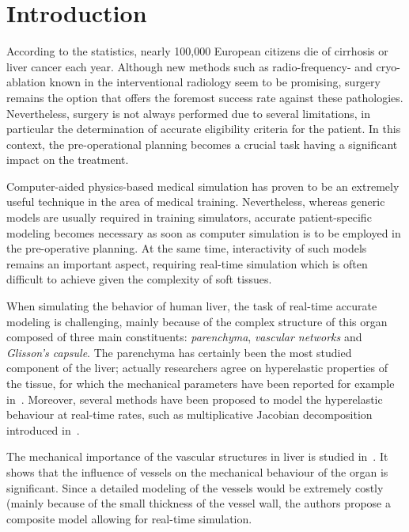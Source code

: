 \documentclass{acm_proc_article-sp}
\newcommand{\TG}[1]{{\color{blue}\textbf{TG: #1}}}
\begin{document}




\section{Introduction} %

According to the statistics, nearly 100,000 European citizens die of cirrhosis or liver cancer each year. 
Although new methods such as radio-frequency- and cryo-ablation known in the interventional radiology 
seem to be promising, surgery remains the option that offers the foremost success rate against these pathologies. 
Nevertheless, surgery is not always performed due to several limitations, in particular the determination 
of accurate eligibility criteria for the patient. 
In this context, the pre-operational planning becomes a crucial task having a significant impact on the treatment. 

Computer-aided physics-based medical simulation has proven to be an extremely useful technique in the area of medical training. 
Nevertheless, whereas generic models are usually required in training simulators, accurate patient-specific modeling
becomes necessary as soon as computer simulation is to be employed in the pre-operative planning. At the same time, 
interactivity of such models remains an important aspect, requiring real-time simulation which is often difficult to 
achieve given the complexity of soft tissues. 

When simulating the behavior of human liver, the task of real-time accurate modeling is challenging, mainly because of the complex structure 
of this organ composed of three main constituents: \emph{parenchyma}, \emph{vascular networks} and \emph{Glisson's capsule}.
The parenchyma has certainly been the most studied component of the liver; actually researchers agree on hyperelastic 
properties of the tissue, for which the mechanical parameters have been reported for example in~\cite{Kerdok2006,Gao2009}. 
Moreover, several methods have been proposed to model the hyperelastic behaviour at real-time rates, such as multiplicative Jacobian decomposition
introduced in~\cite{Marchesseau2010}.

The mechanical importance of the vascular structures in liver is studied in~\cite{Peterlik2012}. It shows that the 
influence of vessels on the mechanical behaviour of the organ is significant. %
Since a detailed modeling of the vessels would be extremely costly (mainly because of the small thickness of the vessel wall, 
the authors propose a composite model allowing for real-time simulation.
\end{document}
